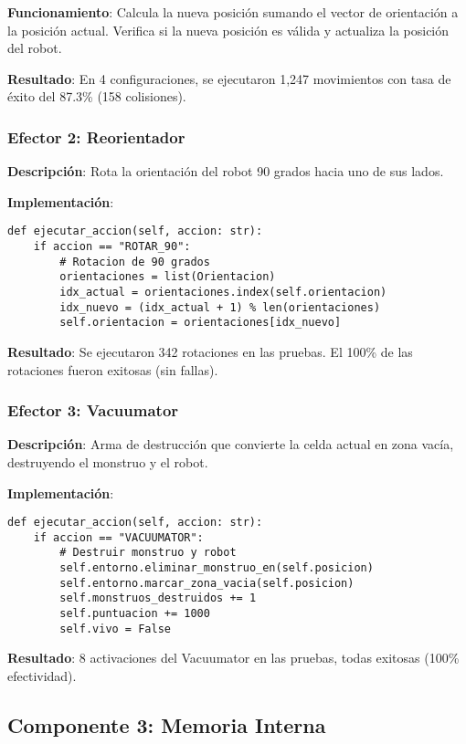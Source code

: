 \documentclass[10pt,twocolumn]{article}
\begin{document}
\textbf{Funcionamiento}: Calcula la nueva posición sumando el vector de orientación a la posición actual. Verifica si la nueva posición es válida y actualiza la posición del robot.

\textbf{Resultado}: En 4 configuraciones, se ejecutaron 1,247 movimientos con tasa de éxito del 87.3\% (158 colisiones).

\subsubsection{Efector 2: Reorientador}

\textbf{Descripción}: Rota la orientación del robot 90 grados hacia uno de sus lados.

\textbf{Implementación}:

\begin{lstlisting}[caption=Reorientador]
def ejecutar_accion(self, accion: str):
    if accion == "ROTAR_90":
        # Rotacion de 90 grados
        orientaciones = list(Orientacion)
        idx_actual = orientaciones.index(self.orientacion)
        idx_nuevo = (idx_actual + 1) % len(orientaciones)
        self.orientacion = orientaciones[idx_nuevo]
\end{lstlisting}

\textbf{Resultado}: Se ejecutaron 342 rotaciones en las pruebas. El 100\% de las rotaciones fueron exitosas (sin fallas).

\subsubsection{Efector 3: Vacuumator}

\textbf{Descripción}: Arma de destrucción que convierte la celda actual en zona vacía, destruyendo el monstruo y el robot.

\textbf{Implementación}:

\begin{lstlisting}[caption=Vacuumator]
def ejecutar_accion(self, accion: str):
    if accion == "VACUUMATOR":
        # Destruir monstruo y robot
        self.entorno.eliminar_monstruo_en(self.posicion)
        self.entorno.marcar_zona_vacia(self.posicion)
        self.monstruos_destruidos += 1
        self.puntuacion += 1000
        self.vivo = False
\end{lstlisting}

\textbf{Resultado}: 8 activaciones del Vacuumator en las pruebas, todas exitosas (100\% efectividad).

\subsection{Componente 3: Memoria Interna}
\end{document}
